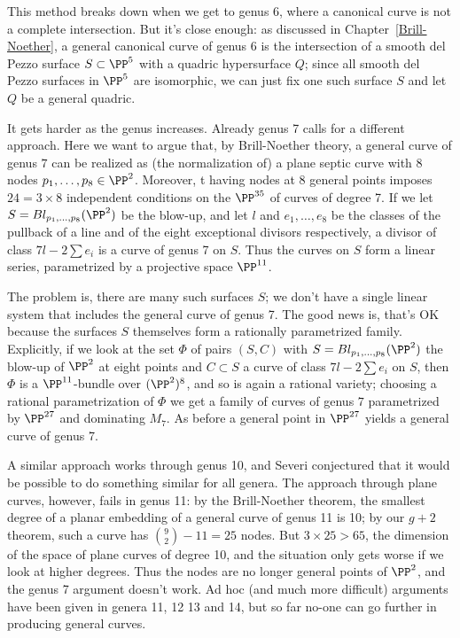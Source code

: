 This method breaks down when we get to genus 6, where a canonical curve is not a complete intersection. But it's close enough: as discussed in Chapter~\ref{Brill-Noether}, a general canonical curve of genus 6 is the intersection of a smooth del Pezzo surface $S \subset \PP^5$ with a quadric hypersurface $Q$; since all smooth del Pezzo surfaces in $\PP^5$ are isomorphic, we can just fix one such surface $S$ and let $Q$ be a general quadric.

It gets harder as the genus increases. Already genus 7 calls for a different approach. Here we want to argue that, by Brill-Noether theory, a general curve of genus $7$ can be realized as (the normalization of) a plane septic curve with 8 nodes $p_1,\dots,p_8 \in \PP^2$. Moreover, t having nodes at 8 general points imposes $24= 3\times 8$ independent conditions on the $\PP^{35}$ of curves of degree 7. 
If we let $S = Bl_{p_1,\dots,p_8}(\PP^2)$ be the blow-up, and let $l$ and $e_1,\dots,e_8$ be the classes of the pullback of a line and of the eight exceptional divisors respectively, a divisor of class $7l - 2 \sum e_i$ is a curve of genus 7 on $S$. Thus the curves on $S$ form a linear series, parametrized by a projective space $\PP^{11}$.

The problem is, there are many such surfaces $S$; we don't have a single linear system that includes the general curve of genus 7. The good news is, that's OK because the surfaces $S$ themselves form a rationally parametrized family. Explicitly, if we look at the set $\Phi$ of pairs $(S, C)$ with $S = Bl_{p_1,\dots,p_8}(\PP^2)$  the blow-up of $\PP^2$ at eight points and $C \subset S$ a curve of class $7l - 2 \sum e_i$ on $S$, then $\Phi$ is a $\PP^{11}$-bundle over $(\PP^2)^8$, and so is again a rational variety; choosing a rational parametrization of $\Phi$ we get a family of curves of genus $7$ parametrized by $\PP^{27}$ and dominating $M_7$. As before a general point in $\PP^{27}$ yields a general curve of genus 7.

A similar approach works through genus 10, and Severi conjectured that it would be possible to do something similar for all genera. The approach through plane curves, however, fails in genus 11: by the Brill-Noether theorem, the smallest degree of a planar embedding of a general curve of genus 11 is 10; by our $g+2$ theorem, such a curve has ${9\choose 2}-11 = 25$ nodes. But $3 \times 25 > 65$, the dimension of the space of plane curves of degree 10, and the situation only gets worse if we look at higher degrees. Thus the nodes are no longer general points of $\PP^2$, and the genus 7 argument doesn't work. 
 Ad hoc (and much more difficult) arguments have been given in genera 11, 12 13 and 14, but so far no-one can go further in producing general curves. 

